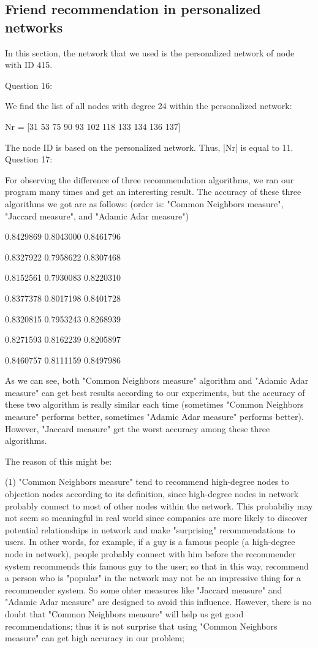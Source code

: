 \documentclass[11pt]{article}
\begin{document}
\subsection{Friend recommendation in personalized networks}

In this section, the network that we used is the personalized network of node with ID 415.

Question 16:

We find the list of all nodes with degree 24 within the personalized network:

Nr = [31  53  75  90  93 102 118 133 134 136 137]

The node ID is based on the personalized network. Thus, |Nr| is equal to 11.\\

Question 17:

For observing the difference of three recommendation algorithms, we ran our program many times and get an interesting result. The accuracy of these three algorithms we got are as follows: (order is: "Common Neighbors measure", "Jaccard measure", and "Adamic Adar measure")

0.8429869 0.8043000 0.8461796

0.8327922 0.7958622 0.8307468

0.8152561 0.7930083 0.8220310

0.8377378 0.8017198 0.8401728

0.8320815 0.7953243 0.8268939

0.8271593 0.8162239 0.8205897

0.8460757 0.8111159 0.8497986

As we can see, both "Common Neighbors measure" algorithm and "Adamic Adar measure" can get best results according to our experiments, but the accuracy of these two algorithm is really similar each time (sometimes "Common Neighbors measure" performs better, sometimes "Adamic Adar measure" performs better). However, "Jaccard measure" get the worst accuracy among these three algorithms. 

The reason of this might be:

(1) "Common Neighbors measure" tend to recommend high-degree nodes to objection nodes according to its definition, since high-degree nodes in network probably connect to most of other nodes within the network. This probabiliy may not seem so meaningful in real world since companies are more likely to discover potential relationships in network and make "surprising" recommendations to users. In other words, for example, if a guy is a famous people (a high-degree node in network), people probably connect with him before the recommender system recommends this famous guy to the user; so that in this way, recommend a person who is "popular" in the network may not be an impressive thing for a recommender system. So some ohter measures like "Jaccard measure" and "Adamic Adar measure" are designed to avoid this influence. However, there is no doubt that "Common Neighbors measure" will help us get good recommendations; thus it is not surprise that using "Common Neighbors measure" can get high accuracy in our problem;
\end{document}
